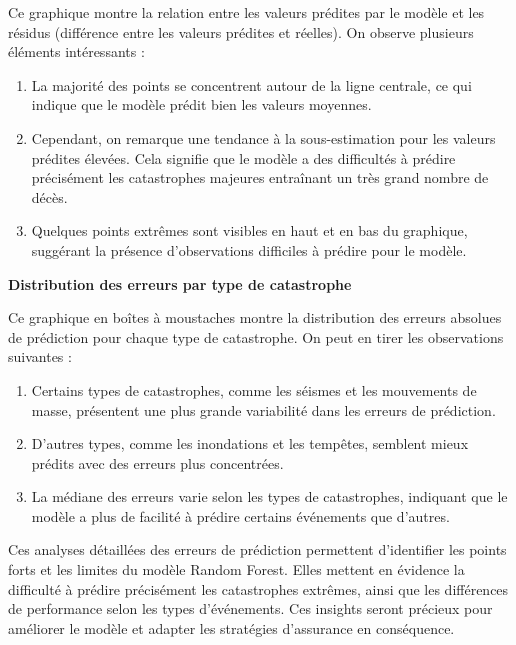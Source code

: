 \documentclass[
]{article}
\providecommand{\tightlist}{%
  \setlength{\itemsep}{0pt}\setlength{\parskip}{0pt}}
\begin{document}
Ce graphique montre la relation entre les valeurs prédites par le modèle
et les résidus (différence entre les valeurs prédites et réelles). On
observe plusieurs éléments intéressants :

\begin{enumerate}
\def\labelenumi{\arabic{enumi}.}
\tightlist
\item
  La majorité des points se concentrent autour de la ligne centrale, ce
  qui indique que le modèle prédit bien les valeurs moyennes.
\item
  Cependant, on remarque une tendance à la sous-estimation pour les
  valeurs prédites élevées. Cela signifie que le modèle a des
  difficultés à prédire précisément les catastrophes majeures entraînant
  un très grand nombre de décès.
\item
  Quelques points extrêmes sont visibles en haut et en bas du graphique,
  suggérant la présence d'observations difficiles à prédire pour le
  modèle.
\end{enumerate}

\textbf{Distribution des erreurs par type de catastrophe}

Ce graphique en boîtes à moustaches montre la distribution des erreurs
absolues de prédiction pour chaque type de catastrophe. On peut en tirer
les observations suivantes :

\begin{enumerate}
\def\labelenumi{\arabic{enumi}.}
\tightlist
\item
  Certains types de catastrophes, comme les séismes et les mouvements de
  masse, présentent une plus grande variabilité dans les erreurs de
  prédiction.
\item
  D'autres types, comme les inondations et les tempêtes, semblent mieux
  prédits avec des erreurs plus concentrées.
\item
  La médiane des erreurs varie selon les types de catastrophes,
  indiquant que le modèle a plus de facilité à prédire certains
  événements que d'autres.
\end{enumerate}

Ces analyses détaillées des erreurs de prédiction permettent
d'identifier les points forts et les limites du modèle Random Forest.
Elles mettent en évidence la difficulté à prédire précisément les
catastrophes extrêmes, ainsi que les différences de performance selon
les types d'événements. Ces insights seront précieux pour améliorer le
modèle et adapter les stratégies d'assurance en conséquence.
\end{document}
